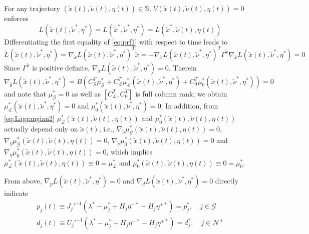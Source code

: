 \documentclass[journal,12pt,onecolumn,draftclsnofoot]{IEEEtran}
\newcommand{\beq}{\begin{equation}}
\newcommand{\eeq}{\end{equation}}
\begin{document}
	For any trajectory $(\tilde x(t), \tilde \nu(t), \eta(t))\in\mathbb{S}$, $\dot V {(\tilde x(t), \tilde \nu(t), \eta(t))} = 0$ enforces
	\beq\label{eq:prf1}
	L(\tilde x(t),\tilde{\nu}^*,\eta^*)  = L(\tilde{x}^*,\tilde{\nu}^*,\eta^*) = L(\tilde{x}^*, \tilde \nu(t), \eta(t))
	\eeq
	Differentiating the first equality of \eqref{eq:prf1} with respect to time leads to
	\beq
	\dot L(\tilde x(t),\tilde{\nu}^*,\eta^*)=\nabla_{\tilde{x}} L(\tilde x(t),\tilde{\nu}^*,\eta^*)^T \dot{\tilde{x}}=- \nabla_{\tilde{x}} L(\tilde x(t),\tilde{\nu}^*,\eta^*)^T   \Gamma^{\tilde{x}}  \nabla_{\tilde{x}} L(\tilde x(t),\tilde{\nu}^*,\eta^*) =0
	\eeq
	Since $\Gamma^{\tilde{x}}$ is positive definite, $ \nabla_{\tilde{x}} L(\tilde x(t),\tilde{\nu}^*,\eta^*) =0$. Therein
	\beq
	\nabla_{\tilde{\theta}} L(\tilde x(t),\tilde{\nu}^*,\eta^*) = B(C_\mathcal{G}^T \mu_\mathcal{G}^* +  C_\mathcal{L}^T \mu_\mathcal{L}^*(\tilde x(t),\tilde{\nu}^*,\eta^*) +C_0^T \mu_0^* (\tilde x(t),\tilde{\nu}^*,\eta^*) ) = 0 
	\eeq
	and note that $\mu^*_{\mathcal{G}}=0$ as well as $[C_\mathcal{L}^T,C_0^T]$ is full column rank, we obtain $ \mu_\mathcal{L}^*(\tilde x(t),\tilde{\nu}^*,\eta^*) =0$ and $\mu_0^* (\tilde x(t),\tilde{\nu}^*,\eta^*) =0$. In addition, from \eqref{eq:Lagrangian2} $\mu_\mathcal{L}^*(\tilde x(t),\tilde{\nu}(t),\eta(t)) $ and $\mu_0^*(\tilde x(t),\tilde{\nu}(t),\eta(t))$ actually depend only on $\tilde{x}(t)$, i.e., $\nabla_{\tilde{\nu}}\mu_{\mathcal{G}}^*(\tilde x(t),\tilde{\nu}(t),\eta(t))=0$, $\nabla_{\eta}\mu_{\mathcal{G}}^*(\tilde x(t),\tilde{\nu}(t),\eta(t))=0$, $\nabla_{\tilde{\nu}}\mu_{0}^*(\tilde x(t),\tilde{\nu}(t),\eta(t))=0$ and $\nabla_{\eta}\mu_0^*(\tilde x(t),\tilde{\nu}(t),\eta(t))=0$, which implies $\mu_\mathcal{L}^*(\tilde x(t),\tilde{\nu}(t),\eta(t)) \equiv 0 =\mu_\mathcal{L}^* $ and $\mu_0^*(\tilde x(t),\tilde{\nu}(t),\eta(t)) \equiv 0 =\mu_0^*$.
	
	From above, $\nabla_{p} L(\tilde x(t),\tilde{\nu}^*,\eta^*)=0$ and $\nabla_{d} L(\tilde x(t),\tilde{\nu}^*,\eta^*)=0$ directly indicate
	\beq
	\begin{split}
		p_j(t) \equiv J_j'^{-1}(\lambda^*-\mu^*_j+H_j\eta^{-*}-H_j\eta^{+*}) =    p^*_j     ,\quad j\in\mathcal{G}     \\
		d_j(t) \equiv U_j'^{-1}(\lambda^*-\mu^*_j+H_j\eta^{-*}-H_j\eta^{+*})    =d^*_j      ,\quad j\in\mathcal{N}^+ 
	\end{split}
	\eeq
	
\end{document}

